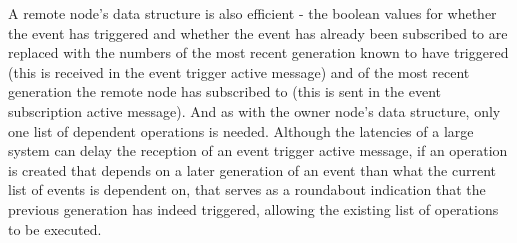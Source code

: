 A remote node's data structure is also efficient - the boolean values for whether the event
has triggered and whether the event has already been subscribed to are replaced with the numbers of the most
recent generation known to have triggered (this is received in the event trigger active message) and of the
most recent generation the remote node has subscribed to (this is sent in the event subscription active
message).  And as with the owner node's data structure, only
one list of dependent operations is needed.  Although the latencies of a large system can delay the
reception of an event trigger active message, if an operation is created that depends on a later generation
of an event than what the current list of events is dependent on, that serves as a roundabout indication that
the previous generation has indeed triggered, allowing the existing list of operations to be executed.




